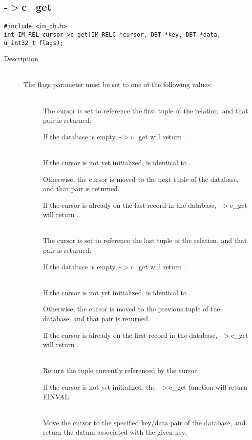 \subsection{{\IMRELcursor}-$>$c\_get}
\begin{verbatim}
#include <im_db.h>
int IM_REL_cursor->c_get(IM_RELC *cursor, DBT *key, DBT *data, u_int32_t flags);
\end{verbatim}
\begin{description}
\item[Description]\ \\

  The flags parameter must be set to one of the following values: 
  \begin{description}
  \item[{\DBFIRST}]\ \\
    The cursor is set to reference the first tuple of the relation,
    and that pair is returned.

    If the database is empty, {\IMRELcursor}-$>$c\_get will return
    {\DBNOTFOUND}.
  \item[{\DBNEXT}]\ \\
    If the cursor is not yet initialized, {\DBNEXT} is identical to
    {\DBFIRST}.

    Otherwise, the cursor is moved to the next tuple of the database,
    and that pair is returned.

    If the cursor is already on the last record in the database,
    {\IMRELcursor}-$>$c\_get will return {\DBNOTFOUND}.
  \item[{\DBLAST}]\ \\
    The cursor is set to reference the last tuple of the relation,
    and that pair is returned.

    If the database is empty, {\IMRELcursor}-$>$c\_get will return
    {\DBNOTFOUND}.
  \item[{\DBPREV}]\ \\
    If the cursor is not yet initialized, {\DBPREV} is identical to
    {\DBLAST}.

    Otherwise, the cursor is moved to the previous tuple of the database,
    and that pair is returned.

    If the cursor is already on the first record in the database,
    {\IMRELcursor}-$>$c\_get will return {\DBNOTFOUND}.
  \item[{\DBCURRENT}]\ \\
    Return the tuple currently referenced by the cursor. 

    If the cursor is not yet initialized, the {\IMRELcursor}-$>$c\_get function
    will return EINVAL.
  \item[{\DBSET}]\ \\
    Move the cursor to the specified key/data pair of the database,
    and return the datum associated with the given key. 


\end{description}
\end{description}
